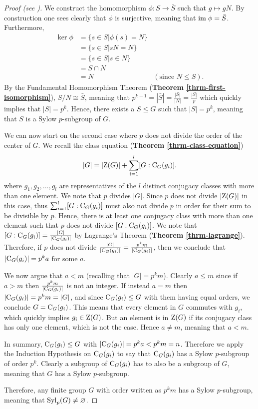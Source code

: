 \begin{proof}[Proof (see {\cite[pp.~1--3]{mann_2011}})]
    We construct the homomorphism $\phi: S \to \bar{S}$ such that $g \mapsto gN$. By construction one sees clearly that $\phi$ is surjective, meaning that $\mathrm{im}\; \phi = \bar{S}$. Furthermore,
    \begin{align*}
        \ker\phi &= \{s \in S \vert \phi(s) = N\}\\
        &= \{s \in S \vert sN = N \}\\
        &= \{s \in S \vert s \in N \}\\
        &= S \cap N\\
        &= N & (\text{since } N \leq S).
    \end{align*}
    By the Fundamental Homomorphism Theorem (\textbf{Theorem \ref{thrm-first-isomorphism}}), $S/N \cong \bar{S}$, meaning that $p^{k-1} = |\bar{S}| = \frac{|S|}{|N|} = \frac{|S|}{p}$ which quickly implies that $|S| = p^k$. Hence, there exists a $S \leq G$ such that $|S| = p^k$, meaning that $S$ is a Sylow $p$-subgroup of $G$.

    We can now start on the second case where $p$ does not divide the order of the center of $G$. We recall the class equation (\textbf{Theorem \ref{thrm-class-equation}})
    \[
        |G| = |\mathrm{Z}(G)| + \sum_{i=1}^l [G:\mathrm{C}_{G}(g_i)].
    \]
    where $g_1, g_2, \dots, g_l$ are representatives of the $l$ distinct conjugacy classes with more than one element. We note that $p$ divides $|G|$. Since $p$ does not divide $|\mathrm{Z}(G)|$ in this case, thus $\sum_{i=1}^l [G:\mathrm{C}_{G}(g_i)]$ must also not divide $p$ in order for their sum to be divisible by $p$. Hence, there is at least one conjugacy class with more than one element such that $p$ does not divide $[G:\mathrm{C}_{G}(g_i)]$. We note that $[G:\mathrm{C}_{G}(g_i)] = \frac{|G|}{|\mathrm{C}_{G}(g_i)|}$ by Lagrange's Theorem (\textbf{Theorem \ref{thrm-lagrange}}). Therefore, if $p$ does not divide $\frac{|G|}{|\mathrm{C}_{G}(g_i)|} = \frac{p^k m}{|\mathrm{C}_{G}(g_i)|}$, then we conclude that $|\mathrm{C}_{G}(g_i)| = p^ka$ for some $a$.

    We now argue that $a < m$ (recalling that $|G| = p^km$). Clearly $a \leq m$ since if $a > m$ then $\frac{p^k m}{|\mathrm{C}_{G}(g_i)|}$ is not an integer. If instead $a = m$ then $|\mathrm{C}_{G}(g_i)| = p^km = |G|$, and since $\mathrm{C}_{G}(g_i) \leq G$ with them having equal orders, we conclude $G = \mathrm{C}_{G}(g_i)$. This means that every element in $G$ commutes with $g_i$, which quickly implies $g_i \in \mathrm{Z}(G)$. But an element is in $\mathrm{Z}(G)$ if its conjugacy class has only one element, which is not the case. Hence $a \neq m$, meaning that $a < m$.

    In summary, $\mathrm{C}_{G}(g_i) \leq G$ with $|\mathrm{C}_{G}(g_i)| = p^ka < p^km = n$. Therefore we apply the Induction Hypothesis on $\mathrm{C}_{G}(g_i)$ to say that $\mathrm{C}_{G}(g_i)$ has a Sylow $p$-subgroup of order $p^k$. Clearly a subgroup of $\mathrm{C}_{G}(g_i)$ has to also be a subgroup of $G$, meaning that $G$ has a Sylow $p$-subgroup.

    Therefore, any finite group $G$ with order written as $p^k m$ has a Sylow $p$-subgroup, meaning that $\mathrm{Syl}_{p}(G) \neq \varnothing$.
\end{proof}

